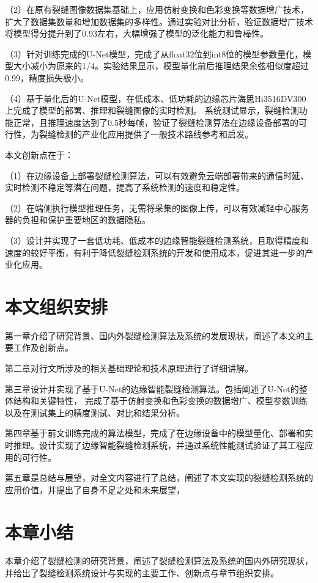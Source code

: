 （2）在原有裂缝图像数据集基础上，应用仿射变换和色彩变换等数据增广技术，扩大了数据集数量和增加数据集的多样性。通过实验对比分析，验证数据增广技术将模型得分提升到了0.93左右，大幅增强了模型的泛化能力和鲁棒性。

（3）针对训练完成的U-Net模型，完成了从float32位到int8位的模型参数量化，模型大小减小为原来的1/4。实验结果显示，模型量化前后推理结果余弦相似度超过0.99，精度损失极小。

（4）基于量化后的U-Net模型，在低成本、低功耗的边缘芯片海思Hi3516DV300上完成了模型的部署、推理和裂缝图像的实时检测。
系统测试显示，裂缝检测功能正常，且推理速度达到了0.5秒每帧，验证了裂缝检测算法在边缘设备部署的可行性，为裂缝检测的产业化应用提供了一般技术路线参考和启发。

本文创新点在于：

（1）在边缘设备上部署裂缝检测算法，可以有效避免云端部署带来的通信时延、实时检测不稳定等潜在问题，提高了系统检测的速度和稳定性。

（2）在端侧执行模型推理任务，无需将采集的图像上传，可以有效减轻中心服务器的负担和保护重要地区的数据隐私。

（3）设计并实现了一套低功耗、低成本的边缘智能裂缝检测系统，且取得精度和速度的较好平衡，有利于降低裂缝检测系统的开发和使用成本，促进其进一步的产业化应用。


\section{本文组织安排}
第一章介绍了研究背景、国内外裂缝检测算法及系统的发展现状，阐述了本文的主要工作及创新点。

第二章对行文所涉及的相关基础理论和技术原理进行了详细讲解。

第三章设计并实现了基于U-Net的边缘智能裂缝检测算法。包括阐述了U-Net的整体结构和关键特性，
完成了基于仿射变换和色彩变换的数据增广、模型参数训练以及在测试集上的精度测试、对比和结果分析。

第四章基于前文训练完成的算法模型，完成了在边缘设备中的模型量化、部署和实时推理。设计实现了边缘智能裂缝检测系统，并通过系统性能测试验证了其工程应用的可行性。

第五章是总结与展望，对全文内容进行了总结，阐述了本文实现的裂缝检测系统的应用价值，并提出了自身不足之处和未来展望，

\section{本章小结}
本章介绍了裂缝检测的研究背景，阐述了裂缝检测算法及系统的国内外研究现状，并给出了裂缝检测系统设计与实现的主要工作、创新点与章节组织安排。
